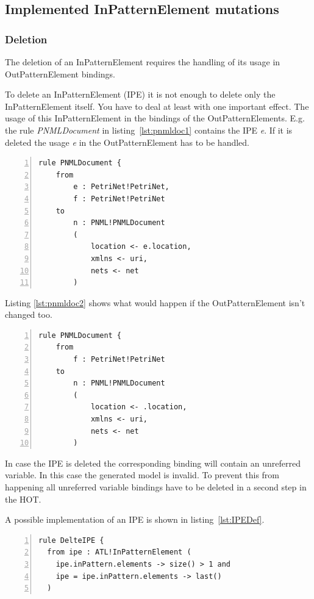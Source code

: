 \documentclass{llncs}
\begin{document}
\subsection{Implemented InPatternElement mutations}

\subsubsection{Deletion}

The deletion of an InPatternElement requires the handling of its usage in OutPatternElement bindings.

To delete an InPatternElement (IPE) it is not enough to delete only the InPatternElement itself. You have to deal at least with one important effect. The usage of this InPatternElement in the bindings of the OutPatternElements. E.g. the rule \emph{PNMLDocument} in listing~\ref{lst:pnmldoc1} contains the IPE \emph{e}. If it is deleted the usage \emph{e} in the OutPatternElement has to be handled.


\begin{lstlisting}[language=ATL, numbers=left,xleftmargin=5.0ex,label=lst:pnmldoc1, caption=Rule with 2 existing IPEs]
rule PNMLDocument {
	from
		e : PetriNet!PetriNet,
		f : PetriNet!PetriNet
	to	
		n : PNML!PNMLDocument
		(
			location <- e.location,
			xmlns <- uri,
			nets <- net			
		)
\end{lstlisting}

Listing \ref{lst:pnmldoc2} shows what would happen if the OutPatternElement isn't changed too.

\begin{lstlisting}[language=ATL, numbers=left,xleftmargin=5.0ex,label=lst:pnmldoc2,caption=Rule with removed IPE]
rule PNMLDocument {
	from
		f : PetriNet!PetriNet
	to	
		n : PNML!PNMLDocument
		(
			location <- .location,
			xmlns <- uri,
			nets <- net			
		)
\end{lstlisting}

In case the IPE is deleted the corresponding binding will contain an unreferred variable. In this case the generated model is invalid. To prevent this from happening all unreferred variable bindings have to be deleted in a second step in the HOT.

A possible implementation of an IPE is shown in listing~\ref{lst:IPEDef}.

\begin{lstlisting}[language=ATL, numbers=left,xleftmargin=5.0ex,label=lst:IPEDef,caption=Delete IPE]
rule DelteIPE {
  from ipe : ATL!InPatternElement (
    ipe.inPattern.elements -> size() > 1 and
    ipe = ipe.inPattern.elements -> last()
  )
\end{lstlisting}
\end{document}
